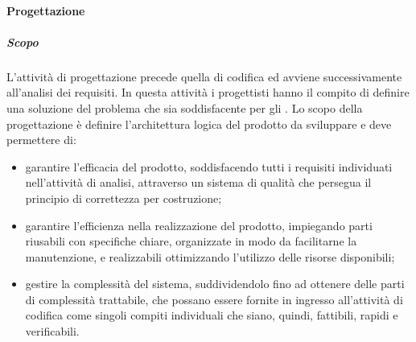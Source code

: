 			\paragraph {Progettazione}
				\subparagraph{Scopo}
					L'attività di progettazione precede quella di codifica ed avviene successivamente all'analisi dei requisiti.
					\newline
					In questa attività i progettisti hanno il compito di definire una soluzione del problema che sia soddisfacente per gli .
					\newline
					Lo scopo della progettazione è definire l'architettura logica del prodotto da sviluppare e deve permettere di:
					\begin{itemize}
						\item garantire l'efficacia del prodotto, soddisfacendo tutti i requisiti individuati nell'attività di analisi, attraverso un sistema di qualità che persegua il principio di correttezza per costruzione;
						\item garantire l'efficienza nella realizzazione del prodotto, impiegando parti riusabili con specifiche chiare, organizzate in modo da facilitarne la manutenzione, e realizzabili ottimizzando l'utilizzo delle risorse disponibili;
						\item gestire la complessità del sistema, suddividendolo fino ad ottenere delle parti di complessità trattabile, che possano essere fornite in ingresso all'attività di codifica come singoli compiti individuali che siano, quindi, fattibili, rapidi e verificabili.
					\end{itemize}

